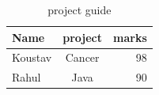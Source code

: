 \documentclass{article}
\begin{document}
\begin{table}[h]
	\centering
	\caption{project guide}
	\begin{tabular}{lcr}
		\toprule
		Name&project&marks\\
		\midrule
		Koustav & Cancer&98\\
		Rahul & Java & 90 \\
		\bottomrule
	\end{tabular}
\end{table}
	
\end{document}
